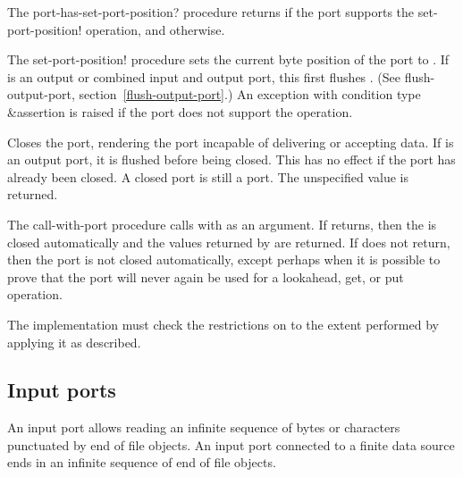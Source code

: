 \begin{entry}{%
}

   
The {\cf port-has-set-port-position?} procedure returns \schtrue{} if the port
supports the {\cf set-port-position!} operation, and \schfalse{}
otherwise.
   
The {\cf set-port-position!} procedure sets the current byte position
of the port to .  If  is an output or combined
input and output port, this first flushes .  (See {\cf
  flush-output-port}, section~\ref{flush-output-port}.)
An exception with condition type {\cf\&assertion} is raised
if the port does not support the operation.
\end{entry}

\begin{entry}{%
}
   
Closes the port, rendering the port incapable of delivering or
accepting data. If  is an output port, it is flushed before
being closed.  This has no effect if the port has already been closed.
A closed port is still a port. The unspecified value is returned.
\end{entry}

\begin{entry}{%
}
   
  The {\cf call-with-port} procedure
calls  with  as an argument. If
 returns, then the  is closed automatically and
the values returned by  are returned. If  does not
return, then the port is not closed automatically, except perhaps when it is
possible to prove that the port will never again be used for a
{\cf lookahead}, {\cf get}, or {\cf put} operation.

\implresp The implementation must check the restrictions on 
to the extent performed by applying it as described.
\end{entry}

\subsection{Input ports}

An input port allows reading an infinite sequence of bytes
or characters punctuated
by end of file objects. An input port connected to a finite data
source ends in an infinite sequence of end of file objects.

